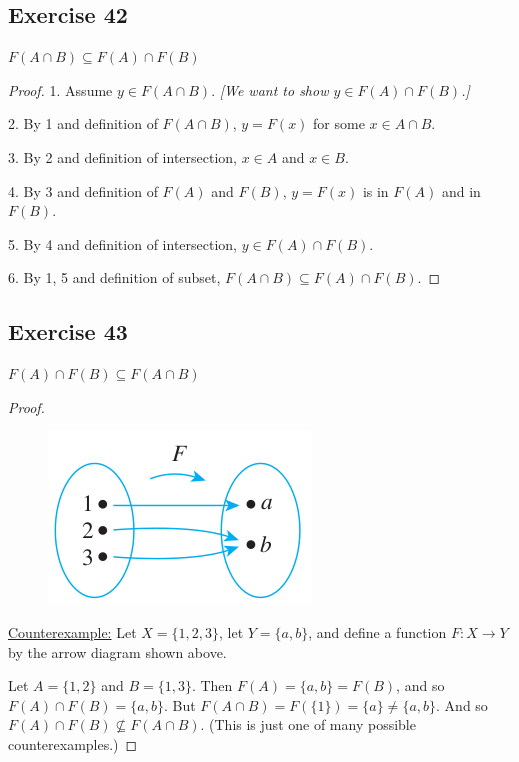 \documentclass[14pt]{extarticle}
\begin{document}
\subsection{Exercise 42}
\(F(A \cap B) \subseteq F(A) \cap F(B)\)

\begin{proof}
1. Assume \(y \in F(A \cap B)\). {\it [We want to show \(y \in F(A) \cap F(B)\).]} 

2. By 1 and definition of \(F(A \cap B)\), \(y = F(x)\) for some \(x \in A \cap B\).

3. By 2 and definition of intersection, \(x \in A\) and \(x \in B\).

4. By 3 and definition of $F(A)$ and $F(B)$, \(y = F(x)\) is in $F(A)$ and in $F(B)$.

5. By 4 and definition of intersection, \(y \in F(A) \cap F(B)\).

6. By 1, 5 and definition of subset, \(F(A \cap B) \subseteq F(A) \cap F(B)\).
\end{proof}

\subsection{Exercise 43}
\(F(A) \cap F(B) \subseteq F(A \cap B)\)

\begin{proof}
\begin{figure}[ht!]
\centering
\includegraphics[scale=0.5]{../images/7.1.43.png}
\end{figure}
\underline{Counterexample:} Let \(X = \{1, 2, 3\}\), let \(Y = \{a, b\}\), and define a function \(F: X \to Y\) 
by the arrow diagram shown above.

Let \(A = \{1, 2\}\) and \(B = \{1, 3\}\). Then \(F(A) = \{a, b\} = F(B)\), and so \(F(A) \cap F(B) = \{a, b\}\). But 
\(F(A \cap B) = F(\{1\}) = \{a\} \neq \{a, b\}\). And so \(F(A) \cap F(B) \nsubseteq F(A \cap B)\). (This is just one 
of many possible counterexamples.)
\end{proof}
\end{document}
